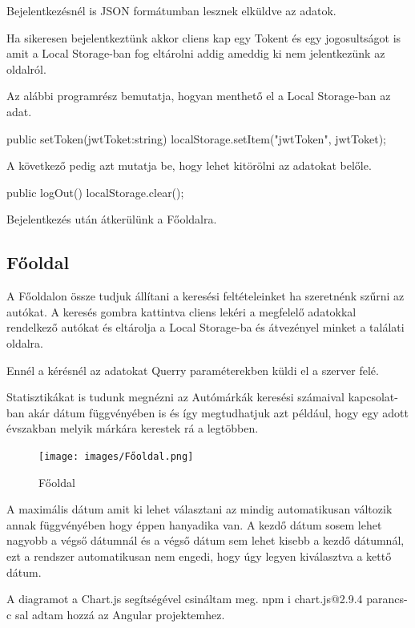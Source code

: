 Bejelentkezésnél is JSON formátumban lesznek elküldve az adatok.

Ha sikeresen bejelentkeztünk akkor cliens kap egy Tokent és egy jogosultságot is amit a Local Storage-ban fog eltárolni addig ameddig ki nem jelentkezünk az oldalról.

Az alábbi programrész bemutatja, hogyan menthető el a Local Storage-ban az adat.

\begin{java}
 public setToken(jwtToket:string){
    localStorage.setItem("jwtToken", jwtToket);
   }
\end{java}

A következő pedig azt mutatja be, hogy lehet kitörölni az adatokat belőle.

\begin{java}
    public logOut(){
    localStorage.clear();
   }
\end{java}

Bejelentkezés után átkerülünk a Főoldalra.

\subsection{Főoldal}

A Főoldalon össze tudjuk állítani a keresési feltételeinket ha szeretnénk szűrni az autókat.
A keresés gombra kattintva cliens lekéri a megfelelő adatokkal rendelkező autókat és eltárolja a Local Storage-ba és átvezényel minket a találati oldalra.

Ennél a kérésnél az adatokat Querry paraméterekben küldi el a szerver felé.

Statisztikákat is tudunk megnézni az Autómárkák keresési számaival kapcsolat-
ban akár dátum függvényében is és így megtudhatjuk azt például, hogy egy adott évszakban melyik márkára kerestek rá a legtöbben.

\begin{figure}[h]
\centering
\texttt{[image: images/Főoldal.png]}
\caption{Főoldal}
\label{fig:Főoldal}
\end{figure}

A maximális dátum amit ki lehet választani az mindig automatikusan változik annak függvényében hogy éppen hanyadika van.
A kezdő dátum sosem lehet nagyobb a végső dátumnál és a végső dátum sem lehet kisebb a kezdő dátumnál, ezt a rendszer automatikusan nem engedi, hogy úgy legyen kiválasztva a kettő dátum.

A diagramot a Chart.js\cite{Chartjs} segítségével csináltam meg. npm i chart.js@2.9.4  parancs-c
sal adtam hozzá az Angular projektemhez.

